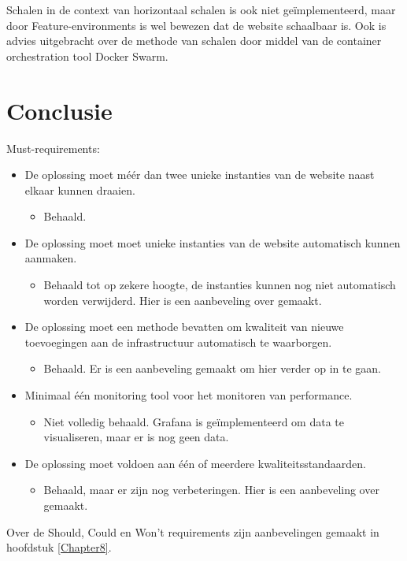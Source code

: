 Schalen in de context van horizontaal schalen is ook niet geïmplementeerd, maar door Feature-environments is wel bewezen dat de website schaalbaar is. Ook is advies uitgebracht over de methode van schalen door middel van de container orchestration tool Docker Swarm.

\section{Conclusie}

Must-requirements:
\begin{itemize}
	\item De oplossing moet méér dan twee unieke instanties van de website naast elkaar kunnen draaien.
    \begin{itemize}
        \item Behaald.
    \end{itemize}

	\item De oplossing moet moet unieke instanties van de website automatisch kunnen aanmaken.
    \begin{itemize}
        \item Behaald tot op zekere hoogte, de instanties kunnen nog niet automatisch worden verwijderd. Hier is een aanbeveling over gemaakt.
    \end{itemize}

	\item De oplossing moet een methode bevatten om kwaliteit van nieuwe toevoegingen aan de infrastructuur automatisch te waarborgen.
    \begin{itemize}
        \item Behaald. Er is een aanbeveling gemaakt om hier verder op in te gaan.
    \end{itemize}

	\item Minimaal één monitoring tool voor het monitoren van performance.
    \begin{itemize}
        \item Niet volledig behaald. Grafana is geïmplementeerd om data te visualiseren, maar er is nog geen data. 
    \end{itemize}

	\item De oplossing moet voldoen aan één of meerdere kwaliteitsstandaarden.
    \begin{itemize}
        \item Behaald, maar er zijn nog verbeteringen. Hier is een aanbeveling over gemaakt.
    \end{itemize}
\end{itemize}

Over de Should, Could en Won't requirements zijn aanbevelingen gemaakt in hoofdstuk \ref{Chapter8}.
